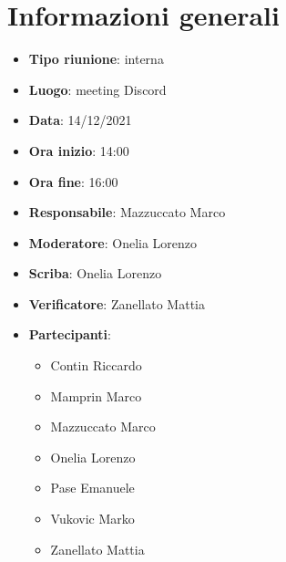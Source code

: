 \section{Informazioni generali}
\begin{itemize}
  \item \textbf{Tipo riunione}: interna
  \item \textbf{Luogo}: meeting Discord
  \item \textbf{Data}: 14/12/2021
  \item \textbf{Ora inizio}: 14:00
  \item \textbf{Ora fine}: 16:00
  \item \textbf{Responsabile}: Mazzuccato Marco
  \item \textbf{Moderatore}: Onelia Lorenzo
  \item \textbf{Scriba}: Onelia Lorenzo
  \item \textbf{Verificatore}: Zanellato Mattia
  \item \textbf{Partecipanti}:
  \begin{itemize}
    \item Contin Riccardo
    \item Mamprin Marco
    \item Mazzuccato Marco
    \item Onelia Lorenzo
    \item Pase Emanuele
    \item Vukovic Marko
    \item Zanellato Mattia
  \end{itemize}
\end{itemize}
